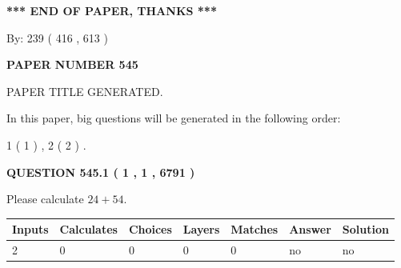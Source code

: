 \documentclass[12pt]{article}
\begin{document}
   
\vspace{1.0in} 
{\textbf{\large{ *** END OF PAPER, THANKS *** }}} 
   
   
\hspace{1.0in} By: 
 239 ( 416 ,  613 )
   
   
   
   
\newpage 
\setcounter{page}{ 
   545001 } 
   
   
   
   
 {\textbf{ \Large{ PAPER NUMBER  545  }}}
   
   
\vspace{0.2in}
   
   
   
   
   
   
   
   
 \vspace{0.2in}
 
 
 
 
   
   
 PAPER TITLE GENERATED.
   
   
   
\vspace{0.2in}
   
In this paper, big questions will be generated in the following order: 
   
   
   1 ( 1 )
 ,
   2 ( 2 )
 .
  
\vspace{0.2in}
  
{\textbf{\Large{QUESTION
545.1 
 ( 1 , 1 , 6791 )
}}}
  
  
 
Please calculate $ %
24 +  %
54 $.
 
 
   
   
   
   
\noindent\begin{tabular}{|l|l|l|l|l|l|l|}
 \hline
Inputs & Calculates & Choices & Layers & Matches & Answer & Solution \\ \hline
 2  & 
 0  & 
 0
  & 
 0  & 
 0  & 
  no & 
  no 
  \\ \hline
 \end{tabular}
   
   
   
   
\noindent{}
   
\end{document}
